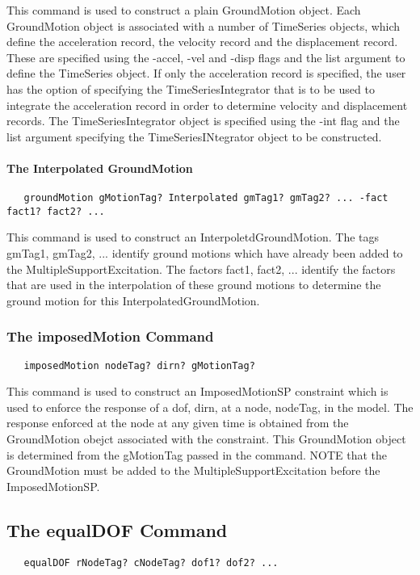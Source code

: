 \documentclass[12pt]{article}
\begin{document}
This command is used to construct a plain GroundMotion object. Each
GroundMotion object is associated with a number of TimeSeries objects,
which define the acceleration record, the velocity record and the
displacement record. These are specified using the -accel, -vel and
-disp flags and the list argument to define the TimeSeries object. If
only the acceleration record is specified, the user has the option of
specifying the TimeSeriesIntegrator that is to be used to integrate
the acceleration record in order to determine velocity and displacement
records. The TimeSeriesIntegrator object is specified using the -int
flag and the list argument specifying the TimeSeriesINtegrator object
to be constructed.

\paragraph{\small The Interpolated GroundMotion}

{\sf\small
\begin{verbatim}
   groundMotion gMotionTag? Interpolated gmTag1? gmTag2? ... -fact fact1? fact2? ...
\end{verbatim}
}

This command is used to construct an InterpoletdGroundMotion. The tags
gmTag1, gmTag2, ... identify ground motions which have already been
added to the MultipleSupportExcitation. The factors fact1, fact2,
... identify the factors that are used in the interpolation of these
ground motions to determine the ground motion for this
InterpolatedGroundMotion.


\subsubsection{The imposedMotion Command}
{\sf\small
\begin{verbatim}
   imposedMotion nodeTag? dirn? gMotionTag? 
\end{verbatim}
}

This command is used to construct an ImposedMotionSP constraint which
is used to enforce the response of a dof, dirn, at a node, nodeTag, in
the model. The response enforced at the node at any given time is
obtained from the GroundMotion obejct associated with the
constraint. This GroundMotion object is determined from the gMotionTag
passed in the command. NOTE that the GroundMotion must be added to the
MultipleSupportExcitation before the ImposedMotionSP. 


\subsection{The equalDOF Command}
{\sf\small
\begin{verbatim}
   equalDOF rNodeTag? cNodeTag? dof1? dof2? ...
\end{verbatim}
}
\end{document}
